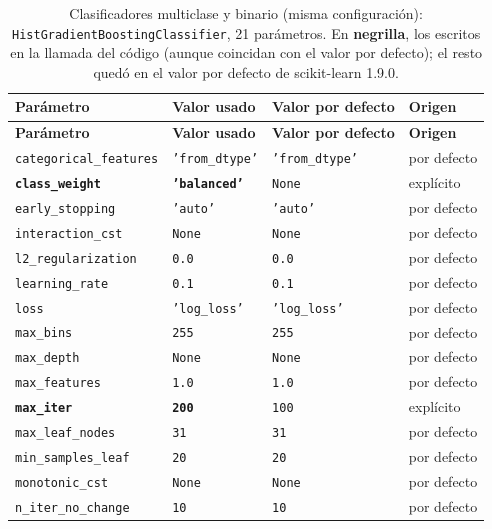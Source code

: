 \begin{longtable}{L{3.9cm} L{3.7cm} L{3.0cm} L{2.4cm}}
\caption{Clasificadores multiclase y binario (misma configuración): \texttt{HistGradientBoostingClassifier}, 21 parámetros. En \textbf{negrilla}, los escritos en la llamada del código (aunque coincidan con el valor por defecto); el resto quedó en el valor por defecto de scikit-learn 1.9.0.}\label{tab:param-hgb}\\
\toprule
\textbf{Parámetro} & \textbf{Valor usado} & \textbf{Valor por defecto} & \textbf{Origen} \\
\midrule
\endfirsthead
\toprule
\textbf{Parámetro} & \textbf{Valor usado} & \textbf{Valor por defecto} & \textbf{Origen} \\
\midrule
\endhead
\bottomrule
\endfoot
\texttt{categorical\_features} & \texttt{'from\_dtype'} & \texttt{'from\_dtype'} & por defecto \\
\textbf{\texttt{class\_weight}} & \textbf{\texttt{'balanced'}} & \texttt{None} & explícito \\
\texttt{early\_stopping} & \texttt{'auto'} & \texttt{'auto'} & por defecto \\
\texttt{interaction\_cst} & \texttt{None} & \texttt{None} & por defecto \\
\texttt{l2\_regularization} & \texttt{0.0} & \texttt{0.0} & por defecto \\
\texttt{learning\_rate} & \texttt{0.1} & \texttt{0.1} & por defecto \\
\texttt{loss} & \texttt{'log\_loss'} & \texttt{'log\_loss'} & por defecto \\
\texttt{max\_bins} & \texttt{255} & \texttt{255} & por defecto \\
\texttt{max\_depth} & \texttt{None} & \texttt{None} & por defecto \\
\texttt{max\_features} & \texttt{1.0} & \texttt{1.0} & por defecto \\
\textbf{\texttt{max\_iter}} & \textbf{\texttt{200}} & \texttt{100} & explícito \\
\texttt{max\_leaf\_nodes} & \texttt{31} & \texttt{31} & por defecto \\
\texttt{min\_samples\_leaf} & \texttt{20} & \texttt{20} & por defecto \\
\texttt{monotonic\_cst} & \texttt{None} & \texttt{None} & por defecto \\
\texttt{n\_iter\_no\_change} & \texttt{10} & \texttt{10} & por defecto \\

\end{longtable}
